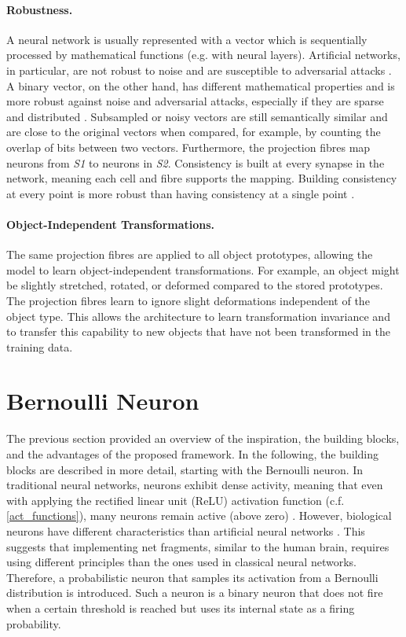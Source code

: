 \paragraph{Robustness.} A neural network is usually represented with a vector which is sequentially processed by mathematical functions (e.g. with neural layers). Artificial networks, in particular, are not robust to noise and are susceptible to adversarial attacks . A binary vector, on the other hand, has different mathematical properties and is more robust against noise and adversarial attacks, especially if they are sparse and distributed .
Subsampled or noisy vectors are still semantically similar and are close to the original vectors when compared, for example, by counting the overlap of bits between two vectors.
Furthermore, the projection fibres map neurons from \emph{S1} to neurons in \emph{S2}. Consistency is built at every synapse in the network, meaning each cell and fibre supports the mapping. Building consistency at every point is more robust than having consistency at a single point .

\paragraph{Object-Independent Transformations.} The same projection fibres are applied to all object prototypes, allowing the model to learn object-independent transformations. For example, an object might be slightly stretched, rotated, or deformed compared to the stored prototypes. The projection fibres learn to ignore slight deformations independent of the object type. This allows the architecture to learn transformation invariance and to transfer this capability to new objects that have not been transformed in the training data.



\section{Bernoulli Neuron}
The previous section provided an overview of the inspiration, the building blocks, and the advantages of the proposed framework. In the following, the building blocks are described in more detail, starting with the Bernoulli neuron.
In traditional neural networks, neurons exhibit dense activity, meaning that even with applying the rectified linear unit (ReLU) activation function (c.f. \eqref{act_functions}), many neurons remain active (above zero) . However, biological neurons have different characteristics than artificial neural networks .
This suggests that implementing net fragments, similar to the human brain, requires using different principles than the ones used in classical neural networks. Therefore, a probabilistic neuron that samples its activation from a Bernoulli distribution is introduced.
Such a neuron is a binary neuron that does not fire when a certain threshold is reached but uses its internal state as a firing probability.

